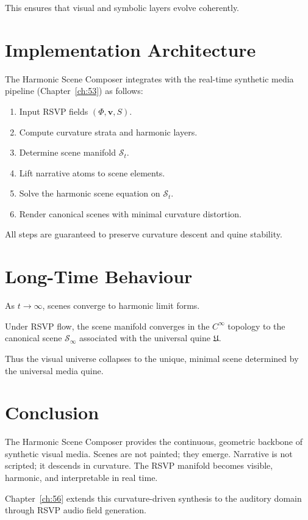 This ensures that visual and symbolic layers evolve coherently.


\section{Implementation Architecture}
\label{sec:55:architecture}

The Harmonic Scene Composer integrates with the real-time synthetic media
pipeline (Chapter~\ref{ch:53}) as follows:

\begin{enumerate}
  \item Input RSVP fields $(\Phi,\mathbf{v},S)$.
  \item Compute curvature strata and harmonic layers.
  \item Determine scene manifold $\mathcal{S}_t$.
  \item Lift narrative atoms to scene elements.
  \item Solve the harmonic scene equation on $\mathcal{S}_t$.
  \item Render canonical scenes with minimal curvature distortion.
\end{enumerate}

All steps are guaranteed to preserve curvature descent and quine stability.


\section{Long-Time Behaviour}
\label{sec:55:long-time}

As $t\to\infty$, scenes converge to harmonic limit forms.

\begin{theorem}
Under RSVP flow, the scene manifold converges in the $C^\infty$ topology to
the canonical scene $\mathcal{S}_\infty$ associated with the universal quine
$\mathfrak{U}$.
\end{theorem}

Thus the visual universe collapses to the unique, minimal scene determined by
the universal media quine.


\section{Conclusion}
\label{sec:55:conclusion}

The Harmonic Scene Composer provides the continuous, geometric backbone of
synthetic visual media.  
Scenes are not painted; they emerge.  
Narrative is not scripted; it descends in curvature.  
The RSVP manifold becomes visible, harmonic, and interpretable in real time.

Chapter~\ref{ch:56} extends this curvature-driven synthesis to the auditory
domain through RSVP audio field generation.

